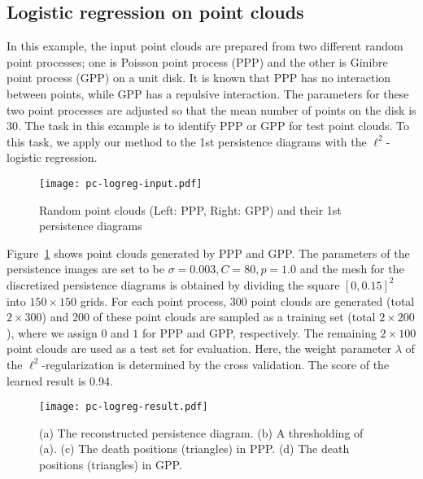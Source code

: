 \documentclass[smallextended]{svjour3}
\begin{document}






\subsection{Logistic regression on point clouds}
In this example, the input point clouds are prepared from two different random
point processes; one is Poisson point process (PPP) and
the other is Ginibre point process (GPP) on a unit disk.
It is known that PPP has no interaction between points, while GPP has a repulsive interaction. The parameters for these two point processes are
adjusted so that the mean number of points on the disk is 30. 
The task in this example is to identify PPP or GPP for test point clouds. 
To this task, we apply our method  to the 1st persistence diagrams with  the $\ell^2$-logistic regression.

\begin{figure}[htbp]
  \centering
  \texttt{[image: pc-logreg-input.pdf]}
  \caption{Random point clouds (Left: PPP, Right: GPP) and their 1st persistence diagrams}
  \label{fig:input_PPP_GPP}
\end{figure}


Figure~\ref{fig:input_PPP_GPP} shows point clouds generated by  
PPP and GPP. The parameters of the persistence images are set to be 
$\sigma=0.003, C=80, p = 1.0$ and the mesh for the discretized persistence diagrams is obtained by dividing the square $[0, 0.15]^2$ into $150\times 150$ grids.  
For each point process, 300 point clouds are generated (total $2 \times 300$)
and 200 of these point clouds are sampled as a training set (total $2 \times 200$), where we assign $0$ and $1$ for PPP and GPP, respectively. The remaining $2 \times 100$ point clouds are used as a test set for evaluation. 
Here, the weight parameter $\lambda$ of the $\ell^2$-regularization is determined by the cross validation. The score of the learned result  is 0.94. 



\begin{figure}[htbp]
  \centering
  \texttt{[image: pc-logreg-result.pdf]}
  \caption{
    (a) The reconstructed persistence diagram. (b) A thresholding of (a).
    (c) The death positions (triangles) in PPP. (d) The death positions (triangles) in GPP.}
  \label{fig:output_pc_logreg}
\end{figure}
\end{document}
